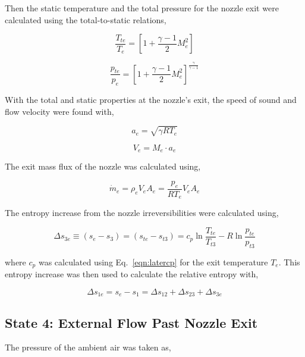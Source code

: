 \documentclass[conf]{new-aiaa} %
\begin{document}
Then the static temperature and the total pressure for the nozzle exit were calculated using the total-to-static relations,

\begin{equation}
    \label{eqn:Te}
    \frac{T_{te}}{T_e}=\left[1+\frac{\gamma-1}{2}M_e^2\right]
\end{equation}

\begin{equation}
    \label{eqn:pte}
    \frac{p_{te}}{p_e}=\left[1+\frac{\gamma-1}{2}M_e^2\right]^\frac{\gamma}{\gamma-1}
\end{equation}

With the total and static properties at the nozzle's exit, the speed of sound and flow velocity were found with,

\begin{equation}
    \label{eqn:ae}
    a_e=\sqrt{\gamma R T_e}
\end{equation}

\begin{equation}
    \label{eqn:Ve}
    V_e=M_e\cdot a_e
\end{equation}

The exit mass flux of the nozzle was calculated using,

\begin{equation}
    \label{eqn:mdote}
    \dot{m}_e=\rho_e V_e A_e=\frac{p_e}{R T_e}V_e A_e
\end{equation}

The entropy increase from the nozzle irreversibilities were calculated using,

\begin{equation}
    \label{eqn:dels3e}
    \Delta s_{3e}\equiv\left(s_e-s_3\right)=\left(s_{te}-s_{t3}\right)=c_p \ln\frac{T_{te}}{T_{t3}}-R\ln\frac{p_{te}}{p_{t3}}
\end{equation}

where $c_p$ was calculated using Eq.~\eqref{eqn:latercp} for the exit temperature $T_e$. This entropy increase was then used to calculate the relative entropy with,

\begin{equation}
    \label{eqn:dels1e}
    \Delta s_{1e}=s_e-s_1=\Delta s_{12}+\Delta s_{23}+\Delta s_{3e}
\end{equation}

\subsection{State 4: External Flow Past Nozzle Exit}
The pressure of the ambient air was taken as,
\end{document}
